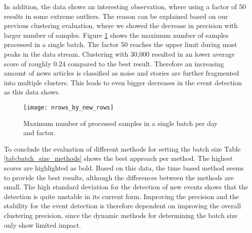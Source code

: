 In addition, the data shows an interesting observation, where using a factor of 50 results in some extreme outliers.
The reason can be explained based on our previous clustering evaluation,
where we showed the decrease in precision with larger number of samples.
Figure \ref{fig:nrows_by_new_rows} shows the maximum number of samples processed in a single batch.
The factor 50 reaches the upper limit during most peaks in the data stream.
Clustering with 30,000 resulted in an lower average score of roughly 0.24 compared to the best result.
Therefore an increasing amount of news articles is classified as noise and stories
are further fragmented into multiple clusters.
This leads to even bigger decreases in the event detection as this data shows.

\begin{figure}[h]
    \centering
    \texttt{[image: nrows\_by\_new\_rows]}
    \caption{Maximum number of processed samples in a single batch per day and factor.}
    \label{fig:nrows_by_new_rows}
 \end{figure}

To conclude the evaluation of different methods for setting the batch size Table \ref{tab:batch_size_methods}
shows the best approach per method.
The highest scores are highlighted as bold.
Based on this data, the time based method seems to provide the best results,
although the differences between the methods are small.
The high standard deviation for the detection of new events shows
that the detection is quite unstable in its current form.
Improving the precision and the stability for the event detection
is therefore dependent on improving the overall clustering precision,
since the dynamic methods for determining the batch size only show limited impact.

\begin{table}[h]
    \centering
    \caption{Final scores obtained by each method for setting the batch size.}
    \label{tab:batch_size_methods}
\end{table}

